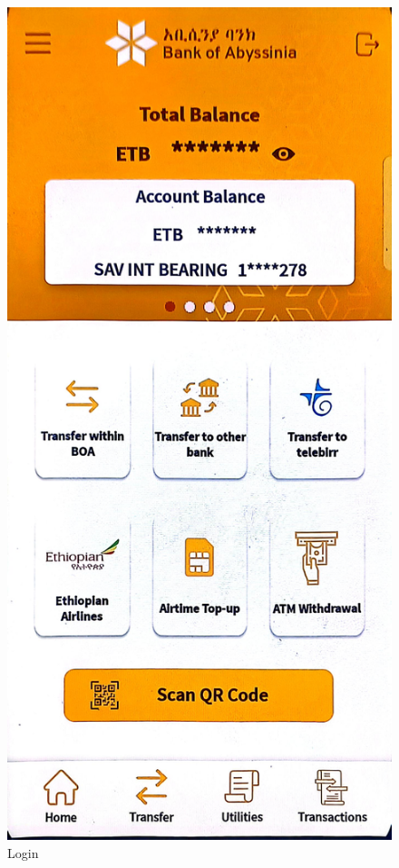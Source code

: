 \documentclass[a4paper,12pt]{report}
\begin{document}
\begin{figure}[h]
\begin{minipage}[b]{0.3\textwidth}
    \caption{Login}
  \end{minipage}
  \hfill
  \begin{minipage}[b]{0.3\textwidth}
    \includegraphics[width=\linewidth]{../images/screenshots/bank-of-abyssinia/boa_home.jpg}

\end{minipage}
\end{figure}
\end{document}
